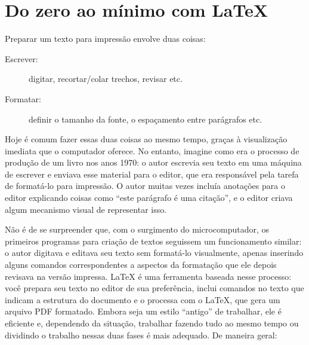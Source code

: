 \chapter{Do zero ao mínimo com \LaTeX{}}

Preparar um texto para impressão envolve duas coisas:

\begin{description}
\item[Escrever:] digitar, recortar/colar trechos, revisar etc.
\item[Formatar:] definir o tamanho da fonte, o
espaçamento entre parágrafos etc.
\end{description}

Hoje é comum fazer essas duas coisas ao mesmo tempo, graças à visualização
imediata que o computador oferece. No entanto, imagine como era o processo de
produção de um livro nos anos 1970: o autor escrevia seu texto em uma máquina
de escrever e enviava esse material para o editor, que era responsável pela
tarefa de formatá-lo para impressão. O autor muitas vezes incluía anotações
para o editor explicando coisas como ``este parágrafo é uma citação'', e o
editor criava algum mecanismo visual de representar isso.

Não é de se surpreender que, com o surgimento do microcomputador, os primeiros
programas para criação de textos seguissem um funcionamento similar: o autor
digitava e editava seu texto sem formatá-lo visualmente, apenas inserindo
alguns comandos correspondentes a aspectos da formatação que ele depois
revisava na versão impressa. \LaTeX{} é uma ferramenta baseada nesse processo:
você prepara seu texto no editor de sua preferência, inclui comandos no texto
que indicam a estrutura do documento e o processa com o \LaTeX{}, que gera um
arquivo PDF formatado. Embora seja um estilo ``antigo'' de trabalhar, ele é
eficiente e, dependendo da situação, trabalhar fazendo tudo ao mesmo tempo
ou dividindo o trabalho nessas duas fases é mais adequado. De maneira geral:

